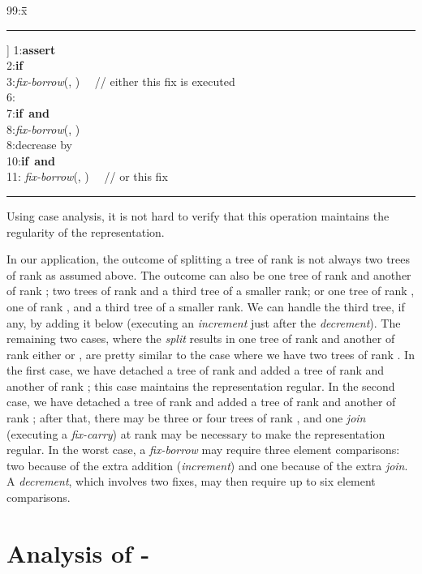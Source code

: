 \documentclass{llncs}
\newenvironment{algorithm}{\par\vspace*{-2mm}\quad\begin{minipage}[t]{0.925\textwidth}\begin{tabbing}99:x\=\quad\=\quad\=\quad\=\quad\=\quad\=\kill}{\end{tabbing}\end{minipage}\par\vspace*{-3mm}}
\newcommand{\ASSERT}{\textbf{assert}\ }
\newcommand{\IF}{\textbf{if}\ }
\newcommand{\AND}{\textbf{and}\ }
\newcommand{\Deletemin}{\mbox{\mbox{\rm -}}}
\begin{document}
\begin{center}
\begin{algorithm}
\rule[6pt]{\textwidth}{0.45pt}\-6pt]
1:\>\ASSERT \\
2:\>\IF \\
3:\>\>\textit{fix-borrow}(, )
~~// either this fix is executed\\
6:\>\\
7:\>\IF  \AND \\
8:\>\>\textit{fix-borrow}(, )\\
8:\>decrease  by \\
10:\>\IF  \AND \\
11:\>\> \textit{fix-borrow}(,
) ~~// or this fix\\
\rule[6pt]{\textwidth}{0.45pt}
\end{algorithm}
\end{center}

\noindent
Using case analysis, it is not hard to verify that this operation maintains the
regularity of the representation.

In our application, the outcome of splitting a tree of rank  
is not always two trees of rank  as assumed above. The
outcome can also be one tree of rank  and another of rank ;
two trees of rank  and a third tree of a smaller rank; or one
tree of rank , one of rank , and a third tree of a smaller
rank. We can handle the third tree, if any, by adding it 
below  (executing an \emph{increment} just after the \emph{decrement}).  
The remaining two cases, where the {\it split} results in one
tree of rank  and another of rank either  or , 
are pretty similar to the case where we have two trees of rank . 
In the first case, we have detached a tree of rank  and added a tree of rank  
and another of rank ; this case maintains the representation regular. 
In the second case, we have detached a tree of rank  and added a tree of rank  
and another of rank ; after that, there may be three or four trees of rank , 
and one {\it join} (executing a {\it fix-carry}) at rank  may be necessary to make the representation regular.  
In the worst case, a \emph{fix-borrow} may require three element comparisons: 
two because of the extra addition (\emph{increment}) and one because of the extra \emph{join}.
A \emph{decrement}, which involves two fixes, may then require up to 
six element comparisons.

\section{Analysis of \Deletemin{}}
\end{document}
